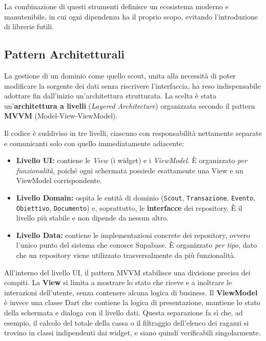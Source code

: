 \documentclass[11pt]{article}
\numberwithin{figure}{section}
\begin{document}
La combinazione di questi strumenti definisce un ecosistema moderno e manutenibile, in cui ogni dipendenza ha il proprio scopo, evitando l'introduzione di librerie futili.

\subsection{Pattern Architetturali}

La gestione di un dominio come quello scout, unita alla necessità di poter modificare la sorgente dei dati senza riscrivere l'interfaccia, ha reso indispensabile adottare fin dall'inizio un'architettura strutturata. La scelta è stata un'\textbf{architettura a livelli} (\textit{Layered Architecture}) organizzata secondo il pattern \textbf{MVVM} (Model-View-ViewModel).

Il codice è suddiviso in tre livelli, ciascuno con responsabilità nettamente separate e comunicanti solo con quello immediatamente adiacente:
\begin{itemize}[topsep=0.5pt]
  \item \textbf{Livello UI:} contiene le \textit{View} (i widget) e i \textit{ViewModel}. È organizzato \textit{per funzionalità}, poiché ogni schermata possiede esattamente una View e un ViewModel corrispondente.

  \item \textbf{Livello Domain:} ospita le entità di dominio (\texttt{Scout}, \texttt{Transazione}, \texttt{Evento}, \texttt{Obiettivo}, \texttt{Documento}) e, soprattutto, le \textbf{interfacce} dei repository. È il livello più stabile e non dipende da nessun altro.

  \item \textbf{Livello Data:} contiene le implementazioni concrete dei repository, ovvero l'unico punto del sistema che conosce Supabase. È organizzato \textit{per tipo}, dato che un repository viene utilizzato trasversalmente da più funzionalità.

\end{itemize}

All'interno del livello UI, il pattern MVVM stabilisce una divisione precisa dei compiti. La \textbf{View} si limita a mostrare lo stato che riceve e a inoltrare le interazioni dell'utente, senza contenere alcuna logica di business. Il \textbf{ViewModel} è invece una classe Dart che contiene la logica di presentazione, mantiene lo stato della schermata e dialoga con il livello dati. Questa separazione fa sì che, ad esempio, il calcolo del totale della cassa o il filtraggio dell'elenco dei ragazzi si trovino in classi indipendenti dai widget, e siano quindi verificabili singolarmente.
\end{document}

